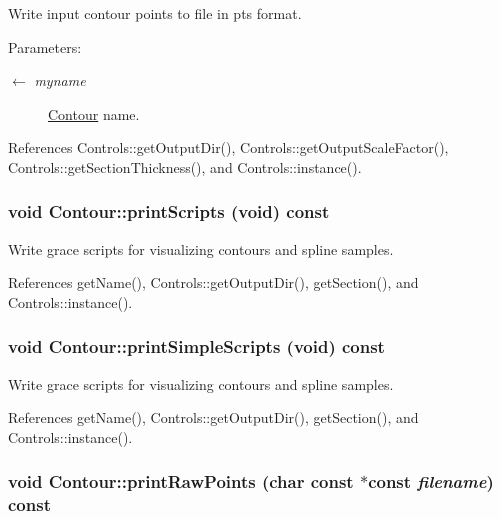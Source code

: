 Write input contour points to file in pts format. \begin{Desc}
\item[Parameters:]
\begin{description}
\item[\mbox{$\leftarrow$} {\em myname}]\hyperlink{classContour}{Contour} name. \end{description}
\end{Desc}


References Controls::getOutputDir(), Controls::getOutputScaleFactor(), Controls::getSectionThickness(), and Controls::instance().\hypertarget{classContour_d82d6b904ce3c2913cef47f197c30994}{
\subsubsection[printScripts]{\setlength{\rightskip}{0pt plus 5cm}void Contour::printScripts (void) const}}
\label{classContour_d82d6b904ce3c2913cef47f197c30994}


Write grace scripts for visualizing contours and spline samples. 

References getName(), Controls::getOutputDir(), getSection(), and Controls::instance().\hypertarget{classContour_49b018412a5f71c9e53400b49a9be29d}{
\subsubsection[printSimpleScripts]{\setlength{\rightskip}{0pt plus 5cm}void Contour::printSimpleScripts (void) const}}
\label{classContour_49b018412a5f71c9e53400b49a9be29d}


Write grace scripts for visualizing contours and spline samples. 

References getName(), Controls::getOutputDir(), getSection(), and Controls::instance().\hypertarget{classContour_54234b52ace49334cf33f55f4a990687}{
\subsubsection[printRawPoints]{\setlength{\rightskip}{0pt plus 5cm}void Contour::printRawPoints (char const $\ast$const  {\em filename}) const}}
\label{classContour_54234b52ace49334cf33f55f4a990687}


